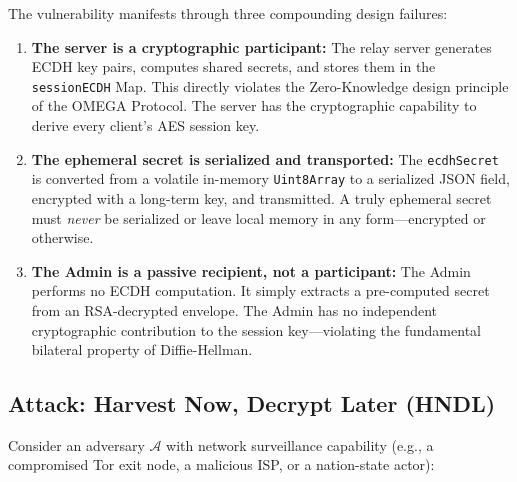 \documentclass[12pt,a4paper]{article}
\begin{document}
The vulnerability manifests through three compounding design failures:

\begin{enumerate}
    \item \textbf{The server is a cryptographic participant:} The relay server generates ECDH key pairs, computes shared secrets, and stores them in the \texttt{sessionECDH} Map. This directly violates the Zero-Knowledge design principle of the OMEGA Protocol. The server has the cryptographic capability to derive every client's AES session key.

    \item \textbf{The ephemeral secret is serialized and transported:} The \texttt{ecdhSecret} is converted from a volatile in-memory \texttt{Uint8Array} to a serialized JSON field, encrypted with a long-term key, and transmitted. A truly ephemeral secret must \textit{never} be serialized or leave local memory in any form---encrypted or otherwise.

    \item \textbf{The Admin is a passive recipient, not a participant:} The Admin performs no ECDH computation. It simply extracts a pre-computed secret from an RSA-decrypted envelope. The Admin has no independent cryptographic contribution to the session key---violating the fundamental bilateral property of Diffie-Hellman.
\end{enumerate}

\subsection{Attack: Harvest Now, Decrypt Later (HNDL)}

Consider an adversary $\mathcal{A}$ with network surveillance capability (e.g., a compromised Tor exit node, a malicious ISP, or a nation-state actor):
\end{document}
